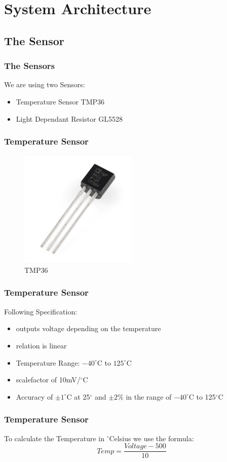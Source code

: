 \documentclass{beamer}
\begin{document}
\section{System Architecture}
\subsection{The Sensor}
\frame
{
	\frametitle{The Sensors}
	We are using two Sensors:	
	\begin{itemize}
	\item Temperature Sensor TMP36
	\item Light Dependant Resistor GL5528	
	\end{itemize}
}

\frame
{
	\frametitle{Temperature Sensor}
	\begin{figure}[h!]
  		\centering
    	\includegraphics[width=0.5\textwidth]{../Images/Temp.jpg}
		\caption{TMP36}
	\end{figure}
}

\frame
{
	\frametitle{Temperature Sensor}
	Following Specification:
	\begin{itemize}
	\item outputs voltage depending on the temperature
	\item relation is linear
	\item Temperature Range: $-40^{\circ}$C to $125^{\circ}$C
	\item scalefactor of 10mV/$^{\circ}$C
	\item Accuracy of $\pm1^{\circ}$C at 25$^{\circ}$ and $\pm2\%$ in the range of $-40^{\circ}$C to 125$^{\circ}$C
	\end{itemize}
}

\frame
{
	\frametitle{Temperature Sensor}
	To calculate the Temperature in $^{\circ}$Celsius we use the formula:\\
	\begin{equation*}
	Temp = \frac{Voltage - 500}{10} 
	\end{equation*}
}
\end{document}
